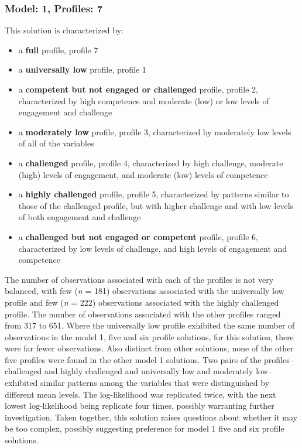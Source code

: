 \documentclass[]{msu-thesis}
\providecommand{\tightlist}{%
  \setlength{\itemsep}{0pt}\setlength{\parskip}{0pt}}
\theoremstyle{definition}
\theoremstyle{definition}
\theoremstyle{definition}
\theoremstyle{remark}
\begin{document}
\subsubsection{Model: 1, Profiles: 7}\label{model-1-profiles-7}

This solution is characterized by:

\begin{itemize}
\tightlist
\item
  a \textbf{full} profile, profile 7
\item
  a \textbf{universally low} profile, profile 1
\item
  a \textbf{competent but not engaged or challenged} profile, profile 2,
  characterized by high competence and moderate (low) or low levels of
  engagement and challenge
\item
  a \textbf{moderately low} profile, profile 3, characterized by
  moderately low levels of all of the variables
\item
  a \textbf{challenged} profile, profile 4, characterized by high
  challenge, moderate (high) levels of engagement, and moderate (low)
  levels of competence
\item
  a \textbf{highly challenged} profile, profile 5, characterized by
  patterns similar to those of the challenged profile, but with higher
  challenge and with low levels of both engagement and challenge
\item
  a \textbf{challenged but not engaged or competent} profile, profile 6,
  characterized by low levels of challenge, and high levels of
  engagement and competence
\end{itemize}

The number of observations associated with each of the profiles is not
very balanced, with few (\emph{n} = 181) observations associated with
the universally low profile and few (\emph{n} = 222) observations
associated with the highly challenged profile. The number of
observations associated with the other profiles ranged from 317 to 651.
Where the universally low profile exhibited the same number of
observations in the model 1, five and six profile solutions, for this
solution, there were far fewer observations. Also distinct from other
solutions, none of the other five profiles were found in the other model
1 solutions. Two pairs of the profiles--challenged and highly challenged
and universally low and moderately low--exhibited similar patterns among
the variables that were distinguished by different mean levels. The
log-likelihood was replicated twice, with the next lowest log-likelihood
being replicate four times, possibly warranting further investigation.
Taken together, this solution raises questions about whether it may be
too complex, possibly suggesting preference for model 1 five and six
profile solutions.
\end{document}
